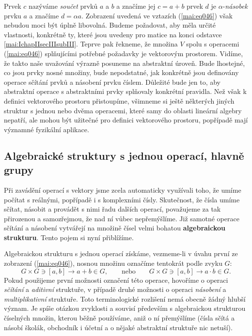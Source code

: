     Prvek \(c\) nazýváme \emph{součet} prvků \(a\) a \(b\) a značíme jej \(c = a + b\) prvek \(d\) 
    je \(\alpha\)-\emph{násobek} prvku \(a\) a značíme \(d = \alpha a\). Zobrazení uvedená ve 
    vztazích (\ref{mai:eq046}) však nebudou moci být úplně libovolná. Budeme požadovat, aby měla 
    určité vlastnosti, konkrétně ty, které jsou uvedeny pro matice na konci odstavce 
    \ref{mai:IchapIIsecIIIsubIII}. Teprve pak řekneme, že množina \(V\) spolu s operacemi 
    (\ref{mai:eq046}) splňujícími potřebné požadavky je vektorovým prostorem. Vidíme, že takto naše 
    uvažování výrazně posuneme na abstraktní úroveň. Bude lhostejné, co jsou prvky nosné množiny, 
    bude nepodstatné, jak konkrétně jsou definovány operace sčítání prvků a násobení prvku číslem. 
    Důležité bude jen to, aby abstraktní operace s abstraktními prvky splňovaly konkrétní pravidla. 
    Než však k definici vektorového prostoru přistoupíme, všimneme si ještě některých jiných 
    struktur s jednou nebo dvěma operacemi, které samy do oblasti lineární algebry nepatří, ale 
    mohou být užitečné pro definici vektorového prostoru, popřípadě mají významné fyzikální 
    aplikace.
      
      \subsection{Algebraické struktury s jednou operací, hlavně grupy}
        Při zavádění operací s vektory jsme zcela automaticky využívali toho, že umíme počítat s 
        reálnými, popřípadě i s komplexními čísly. Skutečnost, že čísla umíme sčítat, násobit a 
        provádět s nimi řadu dalších operací, považujeme za tak přirozenou a samozřejmou, že nad ní 
        vůbec nepřemýšlíme. Již samotné operace sčítání a násobení vytvářejí na množině čísel velmi 
        bohatou \textbf{algebraickou strukturu}. Tento pojem si nyní přiblížíme. 
        
        Algebraickou strukturu s jednou operací získáme, vezmeme-li v úvahu první ze zobrazení 
        (\ref{mai:eq046}), nosnou množinu označíme tentokrát podle zvyku \(G\):
        \begin{equation}\label{mai:eq047}
          G \times G \ni [a,b] \longrightarrow a + b \in G, \qquad \text{nebo} \qquad
          G \times G \ni [a,b] \longrightarrow a \cdot b \in G.
        \end{equation}
        Pokud použijeme první možnosti označení této operace, hovoříme o operaci \emph{sčítání} a 
        \emph{aditivní} struktuře, v případě druhé možnosti o operaci \emph{násobení} a 
        \emph{multiplikativní} struktuře. Toto terminologické rozlišení nemá obecně žádný hlubší 
        význam. Je spíše otázkou zvyklosti a souvisí především s algebraickou strukturou číselných 
        množin, kterou běžně používáme, aniž o ní přemýšlíme (čísla sčítá a násobí školák, 
        obchodník i účetní a o nějaké abstraktní struktuře nic netuší).
        
